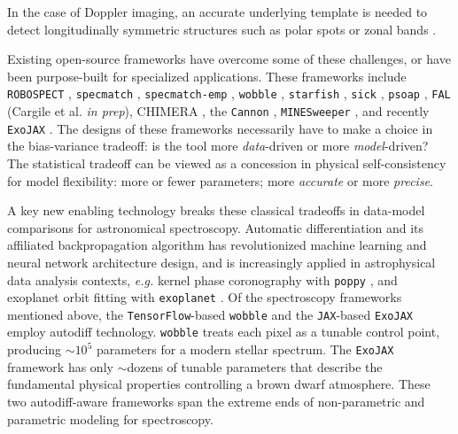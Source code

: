 \documentclass[modern]{aastex631}
\begin{document}
In the case of Doppler imaging, an accurate underlying template is needed to detect longitudinally symmetric structures \citep{1983PASP...95..565V,2021arXiv211006271L} such as polar spots \citep{roettenbacher16} or zonal bands \citep{Crossfield14,2021ApJ...906...64A}.

Existing open-source frameworks have overcome some of these challenges, or have been purpose-built for specialized applications.
These frameworks include \texttt{ROBOSPECT} \citep{2013PASP..125.1164W}, \texttt{specmatch} \citep{2015PhDT........82P}, \texttt{specmatch-emp} \citep{2017ApJ...836...77Y}, \texttt{wobble} \citep{2019AJ....158..164B}, \texttt{starfish} \citep{czekala15}, \texttt{sick} \citep{2016ApJS..223....8C}, \texttt{psoap} \citep{2017ApJ...840...49C}, \texttt{FAL} (Cargile et al. \emph{in prep}), CHIMERA \citep{2015ApJ...807..183L}, the \texttt{Cannon} \citep{2017ApJ...836....5H},  \texttt{MINESweeper} \citep{2020ApJ...900...28C}, and recently \texttt{ExoJAX} \citep{2022ApJS..258...31K}.
The designs of these frameworks necessarily have to make a choice in the bias-variance tradeoff: is the tool more \emph{data}-driven or more \emph{model}-driven?  The statistical tradeoff can be viewed as a concession in physical self-consistency for model flexibility: more or fewer parameters; more \emph{accurate} or more \emph{precise}.

A key new enabling technology breaks these classical tradeoffs in data-model comparisons for astronomical spectroscopy.  Automatic differentiation \citep[``autodiff'',][]{2015arXiv150205767G} and its affiliated backpropagation algorithm has revolutionized machine learning and neural network architecture design, and is increasingly applied in astrophysical data analysis contexts, \emph{e.g.} kernel phase coronography with \texttt{poppy} \citep{2021ApJ...907...40P}, and exoplanet orbit fitting with \texttt{exoplanet} \citep{2021JOSS....6.3285F}.  Of the spectroscopy frameworks mentioned above, the \texttt{TensorFlow}-based \citep{tensorflow2015-whitepaper} \texttt{wobble} and the \texttt{JAX}-based \citep{jax2018github} \texttt{ExoJAX} employ autodiff technology.  \texttt{wobble} treats each pixel as a tunable control point, producing $\sim10^5$ parameters for a modern stellar spectrum.  The \texttt{ExoJAX} framework has only $\sim$dozens of tunable parameters that describe the fundamental physical properties controlling a brown dwarf atmosphere.  These two autodiff-aware frameworks span the extreme ends of non-parametric and parametric modeling for spectroscopy.
\end{document}
